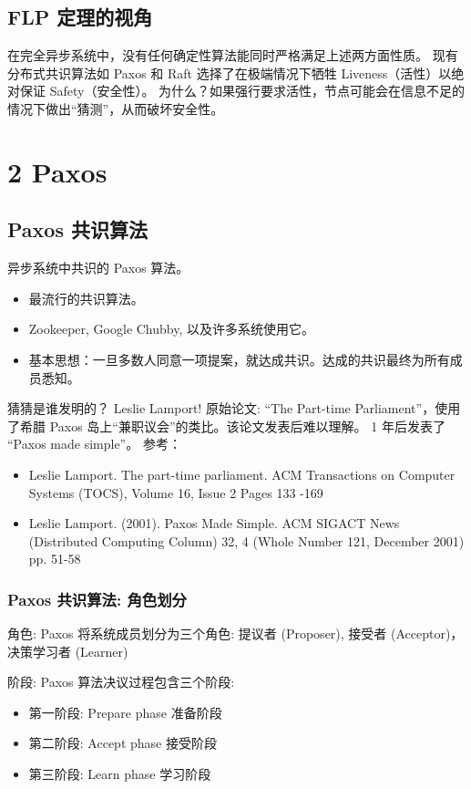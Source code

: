\subsection{FLP 定理的视角}

在完全异步系统中，没有任何确定性算法能同时严格满足上述两方面性质。
现有分布式共识算法如 Paxos 和 Raft 选择了在极端情况下牺牲 Liveness（活性）以绝对保证 Safety（安全性）。
为什么？如果强行要求活性，节点可能会在信息不足的情况下做出“猜测”，从而破坏安全性。

\section{2 Paxos}

\subsection{Paxos 共识算法}

异步系统中共识的 Paxos 算法。
\begin{itemize}
\item 最流行的共识算法。
\item Zookeeper, Google Chubby, 以及许多系统使用它。
\item 基本思想：一旦多数人同意一项提案，就达成共识。达成的共识最终为所有成员悉知。
\end{itemize}

猜猜是谁发明的？ Leslie Lamport! 原始论文: ``The Part-time Parliament''，使用了希腊 Paxos 岛上“兼职议会”的类比。该论文发表后难以理解。 1 年后发表了 ``Paxos made simple''。
参考：
\begin{itemize}
\item Leslie Lamport. The part-time parliament. ACM Transactions on Computer Systems (TOCS), Volume 16, Issue 2 Pages 133 -169
\item Leslie Lamport. (2001). Paxos Made Simple. ACM SIGACT News (Distributed Computing Column) 32, 4 (Whole Number 121, December 2001) pp. 51-58
\end{itemize}

\subsubsection{Paxos 共识算法: 角色划分}

角色: Paxos 将系统成员划分为三个角色: 提议者 (Proposer), 接受者 (Acceptor)，决策学习者 (Learner)

阶段: Paxos 算法决议过程包含三个阶段:
\begin{itemize}
\item 第一阶段: Prepare phase 准备阶段
\item 第二阶段: Accept phase 接受阶段
\item 第三阶段: Learn phase 学习阶段
\end{itemize}

